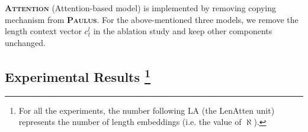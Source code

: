 \documentclass[11pt,a4paper]{article}
\begin{document}
\textsc{\textbf{Attention}} (Attention-based model) is implemented by removing copying mechanism from \textsc{\textbf{Paulus}}. For the above-mentioned three models, we remove the length context vector $c^l_t$ in the ablation study and keep other components unchanged.


\subsection{Experimental Results \footnote{For all the experiments, the number following \textsc{LA} (the LenAtten unit) represents the number of length embeddings (i.e. the value of $\aleph$).}}

\end{document}
